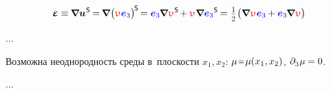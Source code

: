 \begin{otherlanguage}{russian}
\nopagebreak\vspace{-0.25em}\begin{equation*}
\infinitesimaldeformation \equiv
\hspace{-0.1ex} \boldnabla {\bm{u}}^{\hspace{.1ex}\mathsf{S}} \hspace{-0.2ex}
= \hspace{-0.2ex} \boldnabla \hspace{.1ex} \bigl( \antiplanedisplacement \hspace{.1ex} \mathcolor{blue}{\bm{e}_3} \bigr)^{\hspace{-0.2ex}\mathsf{S}} \hspace{-0.25ex}
= \mathcolor{blue}{\bm{e}_3} \hspace{-0.15ex} \boldnabla \hspace{.1ex} \antiplanedisplacement^{\hspace{.1ex}\mathsf{S}} \hspace{-0.25ex}
+ \antiplanedisplacement \hspace{.1ex} \tikzmark{beginZero2} \boldnabla \mathcolor{blue}{\bm{e}_3}\tikzmark{endZero2}^{\mathsf{S}} \hspace{-0.2ex}
= \hspace{.1ex} \smalldisplaystyleonehalf \hspace{.1ex} \bigl( \boldnabla \hspace{.1ex} \antiplanedisplacement \hspace{.12ex} \mathcolor{blue}{\bm{e}_3} \hspace{-0.1ex} + \mathcolor{blue}{\bm{e}_3} \hspace{-0.15ex} \boldnabla \hspace{.1ex} \antiplanedisplacement \bigr)
\end{equation*}%
%

...

Возможна неоднородность среды в~плоскости ${x_1, x_2}$: ${\mu \narroweq \mu(x_1, x_2)}$, ${\partial_{\raisemath{-0.15ex}{\mathcolor{blue}{3}}} \hspace{.08ex} \mu \hspace{-0.1ex} = 0}$.

...



\end{otherlanguage}


